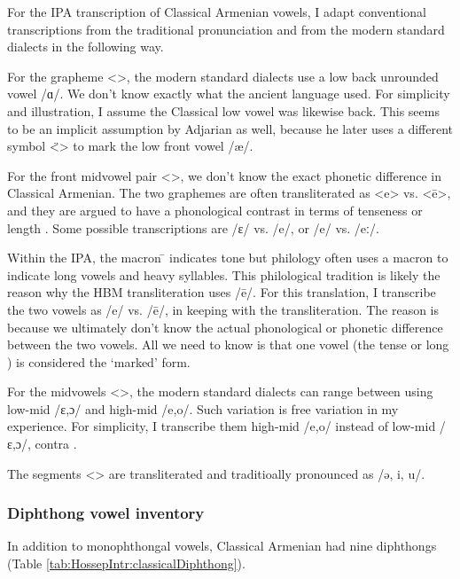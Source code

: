 For the IPA transcription of Classical Armenian vowels, I adapt conventional transcriptions from the traditional pronunciation and from the modern standard dialects in the following way. 


For the grapheme <>, the modern standard dialects use a low back unrounded vowel /ɑ/. We don't know exactly what the ancient language used. For simplicity and illustration, I assume the Classical low vowel was likewise back. This seems to be an implicit assumption by Adjarian as well, because he later uses a different symbol <̈> to mark the low front vowel /æ/. 

For the front midvowel pair <>, we don't know the exact phonetic difference in Classical Armenian. The two graphemes are often transliterated as <e> vs. <ē>, and they are argued to have a phonological contrast in terms of tenseness \citep[14]{Thomson-1989-IntroClassicalArmenian} or length \citep[6]{Godel-1975-IntroClassicalArmenian}. Some  possible transcriptions are /ɛ/ vs. /e/,  or /e/ vs. /eː/. 

Within the IPA, the macron   ̄  indicates tone but philology often uses a macron to indicate long vowels and heavy syllables. This philological tradition is likely the reason why the HBM transliteration uses /ē/. For this translation,   I transcribe the two vowels as /e/ vs. /ē/, in keeping with the transliteration. The reason is because we ultimately don't know the actual phonological or phonetic  difference between the two vowels. All we need to know is that one vowel (the tense or long ) is considered the `marked' form. 


For the midvowels <>, the modern standard dialects can range between using low-mid /ɛ,ɔ/ and high-mid /e,o/. Such variation is free variation in my experience. For simplicity, I transcribe them high-mid /e,o/ instead of low-mid /ɛ,ɔ/, contra \citet[1039]{Macak-2017-PhonoClassicalArmenian}. 

The segments <> are transliterated and traditioally pronounced as /ə, i, u/. 

\subsubsection{Diphthong vowel inventory}\label{sec:HossepIntro:phonotransc:Classical:Diphthong}
In addition to monophthongal vowels, Classical Armenian had nine diphthongs (Table \ref{tab:HossepIntr:classicalDiphthong}). 


